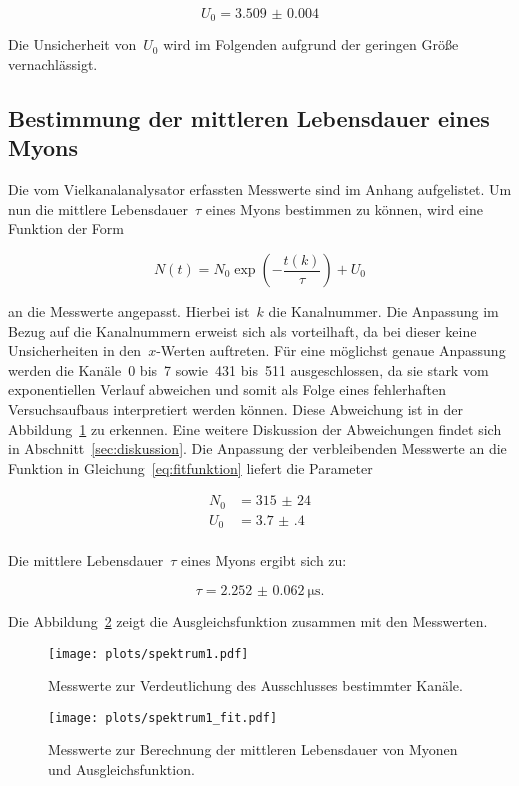 \begin{equation}
  U_0=\num{3.509(4)}
  \label{eq:untergrund_kanal}
\end{equation}

Die Unsicherheit von~$U_0$ wird im Folgenden aufgrund der geringen Größe
vernachlässigt.

\subsection{Bestimmung der mittleren Lebensdauer eines Myons}
Die vom Vielkanalanalysator erfassten Messwerte sind im Anhang aufgelistet. Um nun
die mittlere Lebensdauer~$\tau$ eines Myons bestimmen zu können, wird eine Funktion
der Form

\begin{equation}
  N(t)=N_0\exp\left(-\frac{t(k)}{\tau}\right)+U_0
  \label{eq:fitfunktion}
\end{equation}

an die Messwerte angepasst. Hierbei ist~$k$ die Kanalnummer. Die
Anpassung im Bezug auf die Kanalnummern erweist sich als vorteilhaft, da bei
dieser keine Unsicherheiten in den~$x$-Werten auftreten. Für eine möglichst
genaue Anpassung werden die
Kanäle~\num{0} bis~\num{7} sowie~\num{431} bis~\num{511} ausgeschlossen, da sie stark vom exponentiellen Verlauf
abweichen und somit als Folge eines fehlerhaften Versuchsaufbaus interpretiert
werden können. Diese Abweichung ist in der Abbildung~\ref{fig:spektrum1} zu erkennen.
Eine weitere Diskussion der Abweichungen findet sich in
Abschnitt~\ref{sec:diskussion}. Die Anpassung der
verbleibenden Messwerte an die Funktion in Gleichung~\ref{eq:fitfunktion}
liefert die Parameter

\begin{align}
  N_0&=\num{315(24)} \\
  U_0&=\num{3.7(4)}\\
  \label{eq:fitparameter}
\end{align}

Die mittlere Lebensdauer~$\tau$ eines Myons ergibt sich zu:

\begin{equation}
  \tau=\SI{2.252(62)}{\micro\second}.
  \label{eq:ergebnis}
\end{equation}

Die Abbildung~\ref{fig:spektrum3} zeigt die Ausgleichsfunktion zusammen mit den
Messwerten.

\begin{figure}[htb]
  \centering
  \texttt{[image: plots/spektrum1.pdf]}
  \caption{Messwerte zur Verdeutlichung des Ausschlusses bestimmter Kanäle.}
  \label{fig:spektrum1}
\end{figure}

\begin{figure}[htb]
  \centering
  \texttt{[image: plots/spektrum1\_fit.pdf]}
  \caption{Messwerte zur Berechnung der mittleren Lebensdauer von Myonen und
  Ausgleichsfunktion.}
  \label{fig:spektrum3}
\end{figure}
